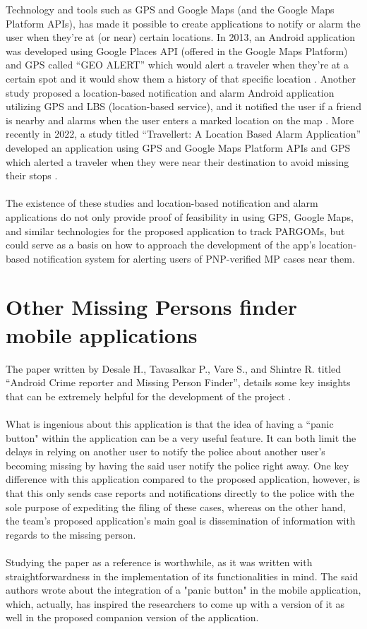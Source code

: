 Technology and tools such as GPS and Google Maps (and the Google Maps Platform APIs), has made it possible to create applications to notify or alarm the user when they’re at (or near) certain locations. In 2013, an Android application was developed using Google Places API (offered in the Google Maps Platform) and GPS called “GEO ALERT” which would alert a traveler when they’re at a certain spot and it would show them a history of that specific location \cite{garg2013geo}. Another study proposed a location-based notification and alarm Android application utilizing GPS and LBS (location-based service), and it notified the user if a friend is nearby and alarms when the user enters a marked location on the map \cite{kanfade2018location}. More recently in 2022, a study titled “Travellert: A Location Based Alarm Application” developed an application using GPS and Google Maps Platform APIs and GPS which alerted a traveler when they were near their destination to avoid missing their stops \cite{travellert}.
\\\\The existence of these studies and location-based notification and alarm applications do not only provide proof of feasibility in using GPS, Google Maps, and similar technologies for the proposed application to track PARGOMs, but could serve as a basis on how to approach the development of the app’s location-based notification system for alerting users of PNP-verified MP cases near them.


\section{Other Missing Persons finder mobile applications}

The paper written by Desale H., Tavasalkar P., Vare S., and Shintre R. titled “Android Crime reporter and Missing Person Finder”, details some key insights that can be extremely helpful for the development of the project \cite{desale2020android}.
\\\\What is ingenious about this application is that the idea of having a “panic button" within the application can be a very useful feature. It can both limit the delays in relying on another user to notify the police about another user's becoming missing by having the said user notify the police right away. One key difference with this application compared to the proposed application, however, is that this only sends case reports and notifications directly to the police with the sole purpose of expediting the filing of these cases, whereas on the other hand, the team’s proposed application’s main goal is dissemination of information with regards to the missing person.
\\\\Studying the paper as a reference is worthwhile, as it was written with straightforwardness in the implementation of its functionalities in mind. The said authors wrote about the integration of a "panic button" in the mobile application, which, actually, has inspired the researchers to come up with a version of it as well in the proposed companion version of the application.
